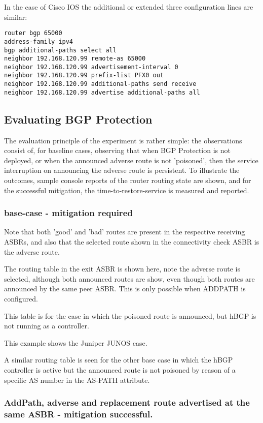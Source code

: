 In the case of Cisco IOS the additional or extended three configuration lines are similar:
\begin{verbatim}
router bgp 65000
address-family ipv4
bgp additional-paths select all
neighbor 192.168.120.99 remote-as 65000
neighbor 192.168.120.99 advertisement-interval 0
neighbor 192.168.120.99 prefix-list PFX0 out
neighbor 192.168.120.99 additional-paths send receive
neighbor 192.168.120.99 advertise additional-paths all
\end{verbatim}

\subsection{Evaluating BGP Protection}

The evaluation principle of the experiment is rather simple: the observations consist of, for baseline cases, observing that when BGP Protection is not deployed, or when the announced adverse route is not 'poisoned', then the service interruption on announcing the adverse route is persistent. To illustrate the outcomes, sample console reports of the router routing state are shown, and for the successful mitigation, the time-to-restore-service is measured and reported.

\subsubsection{base-case - mitigation required}

Note that both 'good' and 'bad' routes are present in the respective receiving ASBRs, and also that the selected route shown in the connectivity check ASBR is the adverse route.

The routing table in the exit ASBR is shown here, note the adverse route is selected, although both announced routes are show, even though both routes are announced by the same peer ASBR. This is only possible when ADDPATH is configured.

This table is for the case in which the poisoned route is announced, but hBGP is not running as a controller.

This example shows the Juniper JUNOS case.

A similar routing table is seen for the other base case in which the hBGP controller is active but the announced route is not poisoned by reason of a specific AS number in the AS-PATH attribute.

\subsubsection{AddPath, adverse and replacement route advertised at the same ASBR - mitigation successful.}

